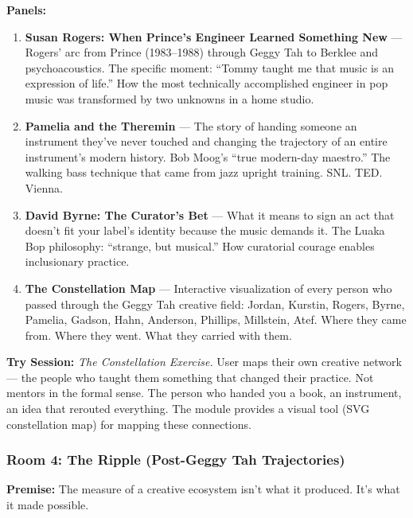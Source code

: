 \documentclass[11pt,letterpaper]{article}
\begin{document}
\textbf{Panels:}
\begin{enumerate}[leftmargin=2em]
\item \textbf{Susan Rogers: When Prince's Engineer Learned Something New} --- Rogers' arc from Prince (1983--1988) through Geggy Tah to Berklee and psychoacoustics. The specific moment: ``Tommy taught me that music is an expression of life.'' How the most technically accomplished engineer in pop music was transformed by two unknowns in a home studio.
\item \textbf{Pamelia and the Theremin} --- The story of handing someone an instrument they've never touched and changing the trajectory of an entire instrument's modern history. Bob Moog's ``true modern-day maestro.'' The walking bass technique that came from jazz upright training. SNL. TED. Vienna.
\item \textbf{David Byrne: The Curator's Bet} --- What it means to sign an act that doesn't fit your label's identity because the music demands it. The Luaka Bop philosophy: ``strange, but musical.'' How curatorial courage enables inclusionary practice.
\item \textbf{The Constellation Map} --- Interactive visualization of every person who passed through the Geggy Tah creative field: Jordan, Kurstin, Rogers, Byrne, Pamelia, Gadson, Hahn, Anderson, Phillips, Millstein, Atef. Where they came from. Where they went. What they carried with them.
\end{enumerate}

\textbf{Try Session:} \textit{The Constellation Exercise.} User maps their own creative network --- the people who taught them something that changed their practice. Not mentors in the formal sense. The person who handed you a book, an instrument, an idea that rerouted everything. The module provides a visual tool (SVG constellation map) for mapping these connections.

\subsubsection{Room 4: The Ripple (Post-Geggy Tah Trajectories)}

\textbf{Premise:} The measure of a creative ecosystem isn't what it produced. It's what it made possible.
\end{document}
